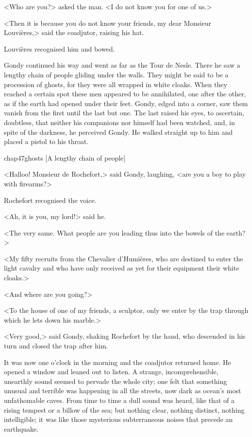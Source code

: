 <Who are you?> asked the man. <I do not know you for one of us.>

<Then it is because you do not know your friends, my dear Monsieur Louvières,> said the coadjutor, raising his hat.

Louvières recognised him and bowed.

Gondy continued his way and went as far as the Tour de Nesle. There he saw a lengthy chain of people gliding under the walls. They might be said to be a procession of ghosts, for they were all wrapped in white cloaks. When they reached a certain spot these men appeared to be annihilated, one after the other, as if the earth had opened under their feet. Gondy, edged into a corner, saw them vanish from the first until the last but one. The last raised his eyes, to ascertain, doubtless, that neither his companions nor himself had been watched, and, in spite of the darkness, he perceived Gondy. He walked straight up to him and placed a pistol to his throat.

\begin{bwbigpic}
	[\basicscale] 
	{chap47ghosts}
	[A lengthy chain of people]
\end{bwbigpic}

<Halloo! Monsieur de Rochefort,> said Gondy, laughing, <are you a boy to play with firearms?>

Rochefort recognised the voice.

<Ah, it is you, my lord!> said he.

<The very same. What people are you leading thus into the bowels of the earth?>

<My fifty recruits from the Chevalier d'Humières, who are destined to enter the light cavalry and who have only received as yet for their equipment their white cloaks.>

<And where are you going?>

<To the house of one of my friends, a sculptor, only we enter by the trap through which he lets down his marble.>

<Very good,> said Gondy, shaking Rochefort by the hand, who descended in his turn and closed the trap after him.

It was now one o'clock in the morning and the coadjutor returned home. He opened a window and leaned out to listen. A strange, incomprehensible, unearthly sound seemed to pervade the whole city; one felt that something unusual and terrible was happening in all the streets, now dark as ocean's most unfathomable caves. From time to time a dull sound was heard, like that of a rising tempest or a billow of the sea; but nothing clear, nothing distinct, nothing intelligible; it was like those mysterious subterraneous noises that precede an earthquake.

